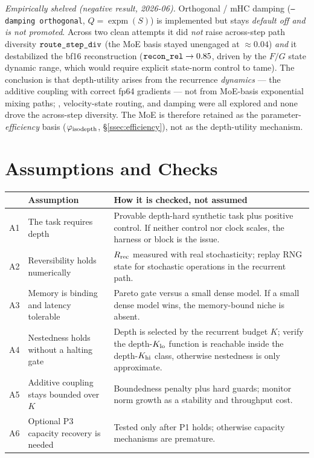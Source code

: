 \documentclass[11pt]{article}
\newcommand{\expm}{\operatorname{expm}}
\newcommand{\code}[1]{\texttt{#1}}
\begin{document}
\emph{Empirically shelved (negative result, 2026-06).}  Orthogonal / mHC damping
(\code{--damping orthogonal}, \(Q=\expm(S)\)) is implemented but stays \emph{default off and is not
promoted}.  Across two clean attempts it did \emph{not} raise across-step path diversity
\(\code{\detokenize{route_step_div}}\) (the MoE basis stayed unengaged at \(\approx0.04\)) \emph{and} it
destabilized the bf16 reconstruction (\(\code{\detokenize{recon_rel}}\to0.85\), driven by the \(F/G\)
state dynamic range, which would require explicit state-norm control to tame).  The conclusion is that
depth-utility arises from the recurrence \emph{dynamics} --- the additive coupling with correct fp64
gradients --- not from MoE-basis exponential mixing paths; \code{},
velocity-state routing, and damping were all explored and none drove the across-step diversity.  The MoE
is therefore retained as the parameter-\emph{efficiency} basis (\(\varphi_{\rm isodepth}\),
\S\ref{ssec:efficiency}), not as the depth-utility mechanism.

\section{Assumptions and Checks}
\label{sec:assumptions}

\renewcommand{\arraystretch}{1.2}
\begin{center}
\footnotesize
\begin{tabularx}{\textwidth}{@{}c L{0.42\textwidth} L{0.40\textwidth}@{}}
\toprule
& \textbf{Assumption} & \textbf{How it is checked, not assumed} \\
\midrule
A1 & The task requires depth & Provable depth-hard synthetic task plus positive control.  If neither control nor clock scales, the harness or block is the issue. \\
A2 & Reversibility holds numerically & \(R_{\rm rec}\) measured with real stochasticity; replay RNG state for stochastic operations in the recurrent path. \\
A3 & Memory is binding and latency tolerable & Pareto gate versus a small dense model.  If a small dense model wins, the memory-bound niche is absent. \\
A4 & Nestedness holds without a halting gate & Depth is selected by the recurrent budget \(K\); verify the depth-\(K_{\rm lo}\) function is reachable inside the depth-\(K_{\rm hi}\) class, otherwise nestedness is only approximate. \\
A5 & Additive coupling stays bounded over \(K\) & Boundedness penalty plus hard guards; monitor norm growth as a stability and throughput cost. \\
A6 & Optional P3 capacity recovery is needed & Tested only after P1 holds; otherwise capacity mechanisms are premature. \\
\bottomrule
\end{tabularx}
\end{center}
\end{document}
